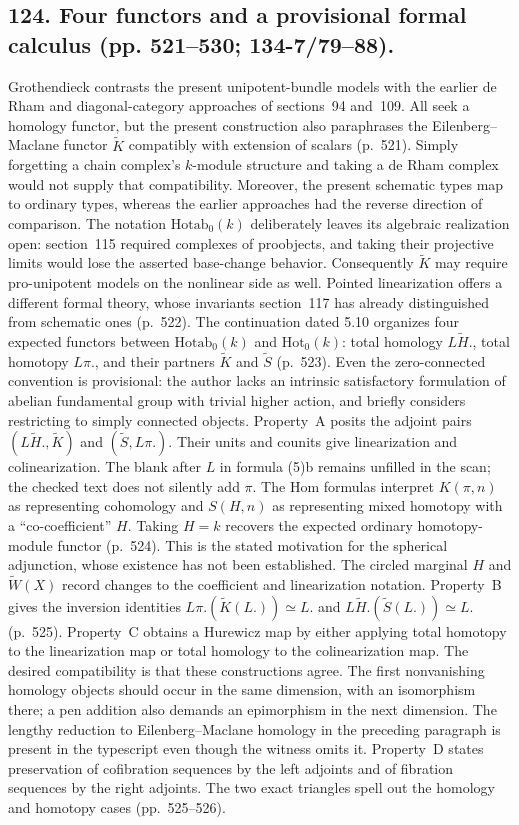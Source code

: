 \documentclass[10pt,oneside]{book}
\begin{document}
\subsection*{124. Four functors and a provisional formal calculus (pp. 521--530; 134-7/79--88).}
Grothendieck contrasts the present unipotent-bundle models with the earlier de Rham and diagonal-category approaches of sections~94 and~109. All seek a homology functor, but the present construction also paraphrases the Eilenberg--Maclane functor $\widetilde K$ compatibly with extension of scalars (p.~521). Simply forgetting a chain complex's $k$-module structure and taking a de Rham complex would not supply that compatibility. Moreover, the present schematic types map to ordinary types, whereas the earlier approaches had the reverse direction of comparison. The notation $\mathrm{Hotab}_0(k)$ deliberately leaves its algebraic realization open: section~115 required complexes of proobjects, and taking their projective limits would lose the asserted base-change behavior. Consequently $\widetilde K$ may require pro-unipotent models on the nonlinear side as well. Pointed linearization offers a different formal theory, whose invariants section~117 has already distinguished from schematic ones (p.~522). The continuation dated 5.10 organizes four expected functors between $\mathrm{Hotab}_0(k)$ and $\mathrm{Hot}_0(k)$: total homology $L\widetilde H.$, total homotopy $L\pi.$, and their partners $\widetilde K$ and $\widetilde S$ (p.~523). Even the zero-connected convention is provisional: the author lacks an intrinsic satisfactory formulation of abelian fundamental group with trivial higher action, and briefly considers restricting to simply connected objects. Property~A posits the adjoint pairs $(L\widetilde H.,\widetilde K)$ and $(\widetilde S,L\pi.)$. Their units and counits give linearization and colinearization. The blank after $L$ in formula (5)b remains unfilled in the scan; the checked text does not silently add $\pi$. The Hom formulas interpret $K(\pi,n)$ as representing cohomology and $S(H,n)$ as representing mixed homotopy with a ``co-coefficient'' $H$. Taking $H=k$ recovers the expected ordinary homotopy-module functor (p.~524). This is the stated motivation for the spherical adjunction, whose existence has not been established. The circled marginal $H$ and $\widetilde W(X)$ record changes to the coefficient and linearization notation. Property~B gives the inversion identities $L\pi.(\widetilde K(L.))\simeq L.$ and $L\widetilde H.(\widetilde S(L.))\simeq L.$ (p.~525). Property~C obtains a Hurewicz map by either applying total homotopy to the linearization map or total homology to the colinearization map. The desired compatibility is that these constructions agree. The first nonvanishing homology objects should occur in the same dimension, with an isomorphism there; a pen addition also demands an epimorphism in the next dimension. The lengthy reduction to Eilenberg--Maclane homology in the preceding paragraph is present in the typescript even though the witness omits it. Property~D states preservation of cofibration sequences by the left adjoints and of fibration sequences by the right adjoints. The two exact triangles spell out the homology and homotopy cases (pp.~525--526). 
\end{document}
